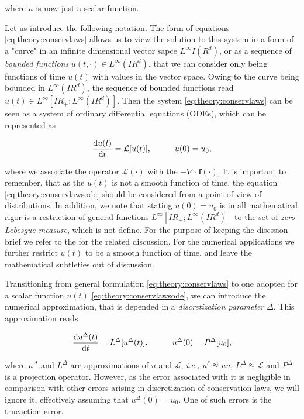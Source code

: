 where $u$ is now just a scalar function. 

Let us introduce the following notation. 
The form of equations \ref{eq:theory:conservlaws} allows us to view the solution to this system in a form of a "curve" in an infinite dimensional vector sapce $L^{\infty}I\!(R^d)$, or as a sequence of \textit{bounded functions} $u(t,\cdot)\in L^{\infty}(I\! R^d)$, that we can consider only being functions of time $u(t)$ with values in the vector space. 
Owing to the curve being bounded in $L^{\infty}(I\!R^d)$, the sequence of bounded functions read $u(t)\in L^{\infty}[I\!R_{+};L^{\infty}(I\!R^d)]$. 
Then the system  \ref{eq:theory:conservlaws} can be seen as a system of ordinary differential equations (ODEs), which can be represented as 

\begin{equation}
\frac{\text{d}u(t)}{\text{d}t} = \mathcal{L}[u(t)], \hspace{10mm} u(0) = u_0,
\label{eq:theory:conservlawsode}
\end{equation}

where we associate the operator $\mathcal{L}(\cdot)$ with the $-\nabla\cdot\boldsymbol{f}(\cdot)$. 
It is important to remember, that as the $u(t)$ is not a smooth function of time, the equation \ref{eq:theory:conservlawsode} should be considered from a point of view of distributions. 
In addition, we note that stating $u(0) = u_0$ is in all mathematical rigor is a restriction of general functions $L^{\infty}[I\!R_{+};L^{\infty}(I\!R^d)]$ to the set of \textit{zero Lebesgue measure}, which is not define. 
For the purpose of keeping the discssion brief we refer to the \cite{Kruzkov:1970} for the related discussion. 
For the numerical applications we further restrict $u(t)$ to be a smooth function of time, and leave the mathematical subtleties out of discussion. 

Transitioning from general formulation \ref{eq:theory:conservlaws} to one adopted for a scalar function $u(t)$ \ref{eq:theory:conservlawsode}, we can introduce the numerical approximation, that is depended in a \textit{discretization parameter} $\Delta$. 
This approximation reads

\begin{equation}
\frac{\text{d}u^{\Delta}(t)}{\text{d}t} = L^{\Delta}[u^{\Delta}(t)], \hspace{10mm} u^{\Delta}(0) = P^{\Delta}[u_0],
\label{eq:theory:conservlawsodepde}
\end{equation}

where $u^{\Delta}$ and $L^{\Delta}$ are approximations of $u$ and $\mathcal{L}$, \textit{i.e.,} $u^{\delta}\approxeq u u$, $L^{\Delta}\approxeq \mathcal{L}$ and $P^{\Delta}$ is a projection operator. 
However, as the error associated with it is negligible in comparison with other errors arising in discretization of conservation laws, we will ignore it, effectively assuming that $u^{\Delta}(0) = u_0$. 
One of such errors is the trucaction error. 

